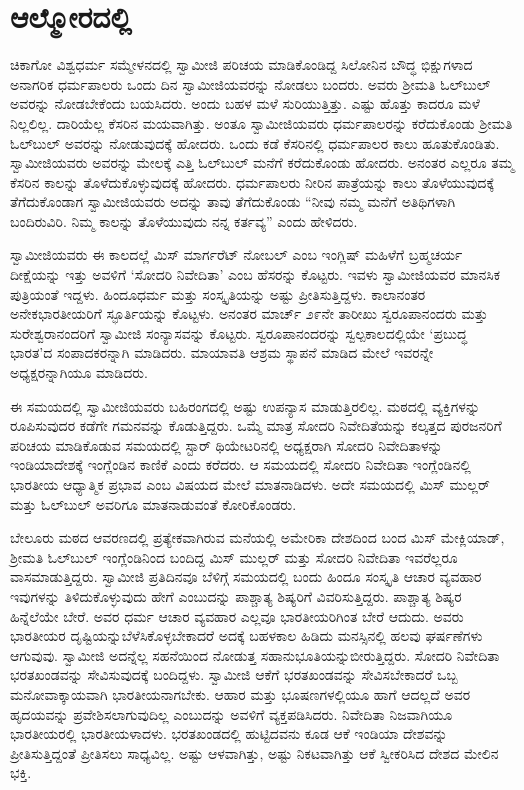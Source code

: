 
\chapter{ಆಲ್ಮೋರದಲ್ಲಿ}

 ಚಿಕಾಗೋ ವಿಶ್ವಧರ್ಮ ಸಮ್ಮೇಳನದಲ್ಲಿ ಸ್ವಾಮೀಜಿ ಪರಿಚಯ ಮಾಡಿಕೊಂಡಿದ್ದ ಸಿಲೋನಿನ ಬೌದ್ಧ ಭಿಕ್ಷುಗಳಾದ ಅನಾಗರಿಕ ಧರ್ಮಪಾಲರು ಒಂದು ದಿನ ಸ್ವಾಮೀಜಿಯವರನ್ನು ನೋಡಲು ಬಂದರು. ಅವರು ಶ‍್ರೀಮತಿ ಓಲ್‍ಬುಲ್ ಅವರನ್ನು ನೋಡಬೇಕೆಂದು ಬಯಸಿದರು. ಅಂದು ಬಹಳ ಮಳೆ ಸುರಿಯುತ್ತಿತ್ತು. ಎಷ್ಟು ಹೊತ್ತು ಕಾದರೂ ಮಳೆ ನಿಲ್ಲಲಿಲ್ಲ. ದಾರಿಯೆಲ್ಲ ಕೆಸರಿನ ಮಯವಾಗಿತ್ತು. ಅಂತೂ ಸ್ವಾಮೀಜಿಯವರು ಧರ್ಮಪಾಲರನ್ನು ಕರೆದುಕೊಂಡು ಶ‍್ರೀಮತಿ ಓಲ್‍ಬುಲ್ ಅವರನ್ನು ನೋಡುವುದಕ್ಕೆ ಹೋದರು. ಒಂದು ಕಡೆ ಕೆಸರಿನಲ್ಲಿ ಧರ್ಮಪಾಲರ ಕಾಲು ಹೂತುಕೊಂಡಿತು. ಸ್ವಾಮೀಜಿಯವರು ಅವರನ್ನು ಮೇಲಕ್ಕೆ ಎತ್ತಿ ಓಲ್‍ಬುಲ್ ಮನೆಗೆ ಕರೆದುಕೊಂಡು ಹೋದರು. ಅನಂತರ ಎಲ್ಲರೂ ತಮ್ಮ ಕೆಸರಿನ ಕಾಲನ್ನು ತೊಳೆದುಕೊಳ್ಳುವುದಕ್ಕೆ ಹೋದರು. ಧರ್ಮಪಾಲರು ನೀರಿನ ಪಾತ್ರೆಯನ್ನು ಕಾಲು ತೊಳೆಯುವುದಕ್ಕೆ ತೆಗೆದುಕೊಂಡಾಗ ಸ್ವಾಮೀಜಿಯವರು ಅದನ್ನು ತಾವು ತೆಗೆದುಕೊಂಡು “ನೀವು ನಮ್ಮ ಮನೆಗೆ ಅತಿಥಿಗಳಾಗಿ ಬಂದಿರುವಿರಿ. ನಿಮ್ಮ ಕಾಲನ್ನು ತೊಳೆಯುವುದು ನನ್ನ ಕರ್ತವ್ಯ” ಎಂದು ಹೇಳಿದರು. 

 ಸ್ವಾಮೀಜಿಯವರು ಈ ಕಾಲದಲ್ಲೆ ಮಿಸ್ ಮಾರ್ಗರೆಟ್ ನೋಬಲ್ ಎಂಬ ಇಂಗ್ಲಿಷ್ ಮಹಿಳೆಗೆ ಬ್ರಹ್ಮಚರ್ಯ ದೀಕ್ಷೆಯನ್ನು ಇತ್ತು ಅವಳಿಗೆ ‘ಸೋದರಿ ನಿವೇದಿತಾ’ ಎಂಬ ಹೆಸರನ್ನು ಕೊಟ್ಟರು. ಇವಳು ಸ್ವಾಮೀಜಿಯವರ ಮಾನಸಿಕ ಪುತ್ರಿಯಂತೆ ಇದ್ದಳು. ಹಿಂದೂಧರ್ಮ ಮತ್ತು ಸಂಸ್ಕೃತಿಯನ್ನು ಅಷ್ಟು ಪ್ರೀತಿಸುತ್ತಿದ್ದಳು. ಕಾಲಾನಂತರ ಅನೇಕ\break ಭಾರತೀಯರಿಗೆ ಸ್ಫೂರ್ತಿಯನ್ನು ಕೊಟ್ಟಳು. ಅನಂತರ ಮಾರ್ಚ್ ೨೯ನೇ ತಾರೀಖು ಸ್ವರೂಪಾನಂದರು ಮತ್ತು ಸುರೇಶ್ವರಾನಂದರಿಗೆ ಸ್ವಾಮೀಜಿ ಸಂನ್ಯಾಸವನ್ನು ಕೊಟ್ಟರು. ಸ್ವರೂಪಾನಂದರನ್ನು ಸ್ವಲ್ಪಕಾಲದಲ್ಲಿಯೇ ‘ಪ್ರಬುದ್ಧ ಭಾರತ’ದ ಸಂಪಾದಕರನ್ನಾಗಿ ಮಾಡಿದರು. ಮಾಯಾವತಿ ಆಶ್ರಮ ಸ್ಥಾಪನೆ ಮಾಡಿದ ಮೇಲೆ ಇವರನ್ನೇ ಅಧ್ಯಕ್ಷರನ್ನಾಗಿಯೂ ಮಾಡಿದರು. 

 ಈ ಸಮಯದಲ್ಲಿ ಸ್ವಾಮೀಜಿಯವರು ಬಹಿರಂಗದಲ್ಲಿ ಅಷ್ಟು ಉಪನ್ಯಾಸ ಮಾಡುತ್ತಿರಲಿಲ್ಲ. ಮಠದಲ್ಲಿ ವ್ಯಕ್ತಿಗಳನ್ನು ರೂಪಿಸುವುದರ ಕಡೆಗೇ ಗಮನವನ್ನು ಕೊಡುತ್ತಿದ್ದರು. ಒಮ್ಮೆ ಮಾತ್ರ ಸೋದರಿ ನಿವೇದಿತೆಯನ್ನು ಕಲ್ಕತ್ತದ ಪುರಜನರಿಗೆ ಪರಿಚಯ ಮಾಡಿಕೊಡುವ ಸಮಯದಲ್ಲಿ ಸ್ಟಾರ್ ಥಿಯೇಟರಿನಲ್ಲಿ ಅಧ್ಯಕ್ಷರಾಗಿ ಸೋದರಿ ನಿವೇದಿತಾಳನ್ನು ಇಂಡಿಯಾದೇಶಕ್ಕೆ ಇಂಗ್ಲೆಂಡಿನ ಕಾಣಿಕೆ ಎಂದು ಕರೆದರು. ಆ ಸಮಯದಲ್ಲಿ ಸೋದರಿ ನಿವೇದಿತಾ ಇಂಗ್ಲೆಂಡಿನಲ್ಲಿ ಭಾರತೀಯ ಆಧ್ಯಾತ್ಮಿಕ ಪ್ರಭಾವ ಎಂಬ ವಿಷಯದ ಮೇಲೆ ಮಾತನಾಡಿದಳು. ಅದೇ ಸಮಯದಲ್ಲಿ ಮಿಸ್ ಮುಲ್ಲರ್ ಮತ್ತು ಓಲ್‍ಬುಲ್ ಅವರಿಗೂ ಮಾತನಾಡುವಂತೆ ಕೋರಿಕೊಂಡರು. 

 ಬೇಲೂರು ಮಠದ ಆವರಣದಲ್ಲಿ ಪ್ರತ್ಯೇಕವಾಗಿರುವ ಮನೆಯಲ್ಲಿ ಅಮೇರಿಕಾ ದೇಶದಿಂದ ಬಂದ ಮಿಸ್ ಮೇಕ್ಲಿಯಾಡ್, ಶ‍್ರೀಮತಿ ಓಲ್‍ಬುಲ್ ಇಂಗ್ಲೆಂಡಿನಿಂದ ಬಂದಿದ್ದ ಮಿಸ್ ಮುಲ್ಲರ್ ಮತ್ತು ಸೋದರಿ ನಿವೇದಿತಾ ಇವರೆಲ್ಲರೂ ವಾಸಮಾಡುತ್ತಿದ್ದರು. ಸ್ವಾಮೀಜಿ ಪ್ರತಿದಿನವೂ ಬೆಳಿಗ್ಗೆ ಸಮಯದಲ್ಲಿ ಬಂದು ಹಿಂದೂ ಸಂಸ್ಕೃತಿ ಆಚಾರ ವ್ಯವಹಾರ ಇವುಗಳನ್ನು ತಿಳಿದುಕೊಳ್ಳುವುದು ಹೇಗೆ ಎಂಬುದನ್ನು ಪಾಶ್ಚಾತ್ಯ ಶಿಷ್ಯರಿಗೆ ವಿವರಿಸುತ್ತಿದ್ದರು. ಪಾಶ್ಚಾತ್ಯ ಶಿಷ್ಯರ ಹಿನ್ನೆಲೆಯೇ ಬೇರೆ. ಅವರ ಧರ್ಮ ಆಚಾರ ವ್ಯವಹಾರ ಎಲ್ಲವೂ ಭಾರತೀಯರಿಗಿಂತ ಬೇರೆ ಆದುದು. ಅವರು ಭಾರತೀಯರ ದೃಷ್ಟಿಯನ್ನು\break ಬೆಳೆಸಿಕೊಳ್ಳಬೇಕಾದರೆ ಅದಕ್ಕೆ ಬಹಳಕಾಲ ಹಿಡಿದು ಮನಸ್ಸಿನಲ್ಲಿ ಹಲವು ಘರ್ಷಣೆಗಳು ಆಗುವುವು. ಸ್ವಾಮೀಜಿ ಅದನ್ನೆಲ್ಲ ಸಹನೆಯಿಂದ ನೋಡುತ್ತ ಸಹಾನುಭೂತಿಯನ್ನು\break ಬೀರುತ್ತಿದ್ದರು. ಸೋದರಿ ನಿವೇದಿತಾ ಭರತಖಂಡವನ್ನು ಸೇವಿಸುವುದಕ್ಕೆ ಬಂದಿದ್ದಳು. ಸ್ವಾಮೀಜಿ ಆಕೆಗೆ ಭರತಖಂಡವನ್ನು ಸೇವಿಸಬೇಕಾದರೆ ಒಬ್ಬ ಮನೋವಾಕ್ಕಾಯವಾಗಿ ಭಾರತೀಯನಾಗಬೇಕು. ಆಹಾರ ಮತ್ತು ಭೂಷಣಗಳಲ್ಲಿಯೂ ಹಾಗೆ ಆದಲ್ಲದೆ ಅವರ ಹೃದಯವನ್ನು ಪ್ರವೇಶಿಸಲಾಗುವುದಿಲ್ಲ ಎಂಬುದನ್ನು ಅವಳಿಗೆ ವ್ಯಕ್ತಪಡಿಸಿದರು. ನಿವೇದಿತಾ ನಿಜವಾಗಿಯೂ ಭಾರತೀಯರಲ್ಲಿ ಭಾರತೀಯಳಾದಳು. ಭರತಖಂಡದಲ್ಲಿ ಹುಟ್ಟಿದವನು ಕೂಡ ಆಕೆ ಇಂಡಿಯಾ ದೇಶವನ್ನು ಪ್ರೀತಿಸುತ್ತಿದ್ದಂತೆ ಪ್ರೀತಿಸಲು ಸಾಧ್ಯವಿಲ್ಲ. ಅಷ್ಟು ಆಳವಾಗಿತ್ತು, ಅಷ್ಟು ನಿಕಟವಾಗಿತ್ತು ಆಕೆ ಸ್ವೀಕರಿಸಿದ ದೇಶದ ಮೇಲಿನ ಭಕ್ತಿ. 

